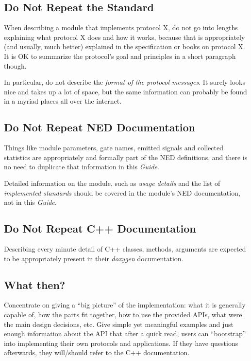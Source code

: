 \subsection{Do Not Repeat the Standard}

When describing a module that implements protocol X, do not go
into lengths explaining what protocol X does and how it works,
because that is appropriately (and usually, much better) explained 
in the specification or books on protocol X. It is OK to summarize
the protocol's goal and principles in a short paragraph though.

In particular, do not describe the \textit{format of the protocol messages}.
It surely looks nice and takes up a lot of space, but the same information
can probably be found in a myriad places all over the internet.

\subsection{Do Not Repeat NED Documentation}

Things like module parameters, gate names, emitted signals and collected 
statistics are appropriately and formally part of the NED definitions,
and there is no need to duplicate that information in this \textit{Guide}.

Detailed information on the module, such as \textit{usage details} and the 
list of \textit{implemented standards} should be covered in the module's 
NED documentation, not in this \textit{Guide}.

\subsection{Do Not Repeat C++ Documentation}

Describing every minute detail of C++ classes, methods, arguments are
expected to be appropriately present in their \textit{doxygen}
documentation.

\subsection{What then?}

Concentrate on giving a ``big picture'' of the implementation: what it is
generally capable of, how the parts fit together, how to use the provided APIs,
what were the main design decisions, etc. Give simple yet meaningful examples
and just enough information about the API that after a quick read, users can
``bootstrap'' into implementing their own protocols and applications. If they
have questions afterwards, they will/should refer to the C++ documentation.


